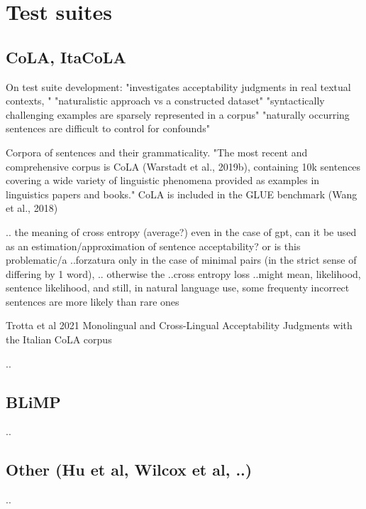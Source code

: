 \section{Test suites}



\subsection{CoLA, ItaCoLA}

On test suite development:
"investigates acceptability judgments in real textual contexts, " \citep{lau2020furiously} 
"naturalistic approach vs a constructed dataset"
"syntactically challenging examples are sparsely represented in a corpus" "naturally occurring sentences are difficult to control for confounds" \citep{marvin2018targeted}

Corpora of sentences and their grammaticality. "The most recent
and comprehensive corpus is CoLA (Warstadt et al., 2019b), containing 10k sentences covering a wide variety of linguistic phenomena provided as examples in linguistics papers and books."\citep{warstadt2020blimp}	
CoLA is included in the GLUE benchmark (Wang et al., 2018)

..
the meaning of cross entropy (average?)
even in the case of gpt, can it be used as an estimation/approximation of sentence acceptability?
or is this problematic/a ..forzatura
only in the case of minimal pairs (in the strict sense of differing by 1 word), ..
otherwise the ..cross entropy loss ..might mean, likelihood, sentence likelihood, and still, in natural language use, some frequenty incorrect sentences are more likely than rare ones

Trotta et al 2021 Monolingual and Cross-Lingual Acceptability Judgments with the Italian CoLA corpus

..

\subsection{BLiMP}
..
\subsection{Other (Hu et al, Wilcox et al, ..)}
..


